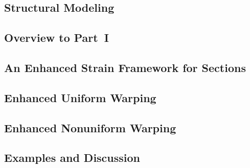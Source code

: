 \begin{Notation}[section]
% 


\part{Structural Modeling}\label{part:modeling}

\chapter{Overview to Part~I}\label{sec:Part-I}

\clearpage


\chapter{An Enhanced Strain Framework for Sections}\label{sec:gensec}

% 
\clearpage

\chapter{Enhanced Uniform Warping}\label{sec:timo}

\clearpage

\chapter{Enhanced Nonuniform Warping}\label{sec:nonuniform}

\clearpage 

% 
% 

\chapter{Examples and Discussion}\label{sec:part-i-summary}

\clearpage



\end{Notation}
